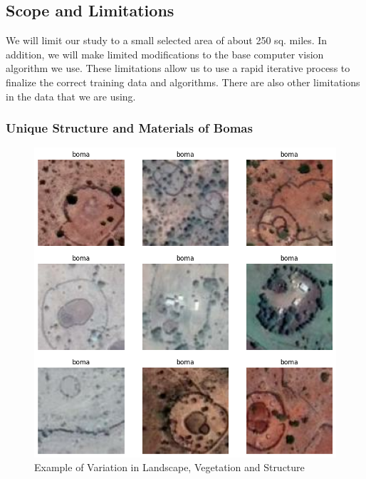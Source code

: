 \documentclass[10pt]{article}
\begin{document}

\subsection{Scope and Limitations}

We will limit our study to a small selected area of about 250 sq. miles. In addition, we will make limited modifications to the base computer vision algorithm we use. These limitations allow us to use a rapid iterative process to finalize the correct training data and algorithms. There are also other limitations in the data that we are using.

\subsubsection{Unique Structure and Materials of Bomas}

\begin{figure} [H]
    \centering
    \includegraphics[width=0.8\linewidth]{images/types of bomas.png}
    \caption{Example of Variation in Landscape, Vegetation and Structure}
    \label{fig:types_of_bomas}
\end{figure}
\end{document}
